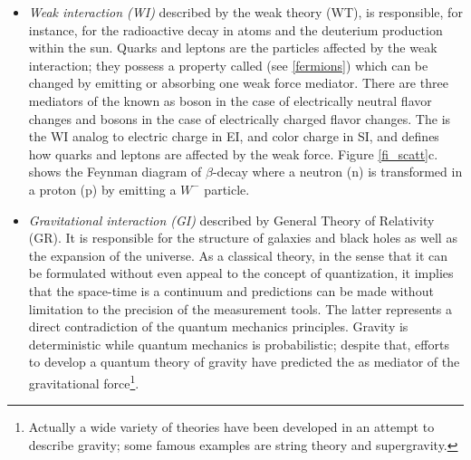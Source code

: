 \begin{itemize}
\item \textit{Weak interaction (WI)} described by the weak theory (WT), is responsible, for instance, for the radioactive decay in atoms and the deuterium production within the sun. Quarks and leptons are the particles affected by the weak interaction; they possess a property called  (see \ref{fermions}) which can be changed by emitting or absorbing one weak force mediator. There are three mediators of the  known as  boson in the case of electrically neutral flavor changes and  bosons in the case of electrically charged flavor changes. The  is the WI analog to electric charge in EI, and color charge in SI, and defines how quarks and leptons are affected by the weak force. Figure \ref{fi_scatt}c. shows the Feynman diagram of $\beta$-decay where a neutron (n) is transformed in a proton (p) by emitting a $W^-$ particle. %

\item \textit{Gravitational interaction (GI)} described by General Theory of Relativity (GR). It is responsible for the structure of galaxies and black holes as well as the expansion of the universe. As a classical theory, in the sense that it can be formulated without even appeal to the concept of quantization, it implies that the space-time is a continuum and predictions can be made without limitation to the precision of the measurement tools. The latter represents a direct contradiction of the quantum mechanics principles. Gravity is deterministic while quantum mechanics is probabilistic; despite that, efforts to develop a quantum theory of gravity have predicted the  as mediator of the gravitational force\footnote{Actually a wide variety of theories have been developed in an attempt to describe gravity; some famous examples are string theory and supergravity.}.     
\end{itemize}

